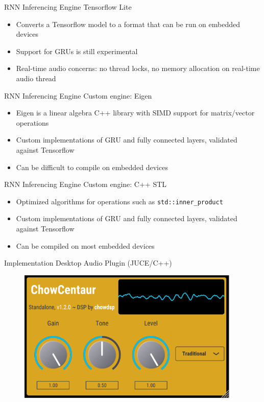 \begin{frame}{RNN Inferencing Engine}
    Tensorflow Lite
    \begin{itemize}
        \item Converts a Tensorflow model to a format that can be run on embedded devices
        \item Support for GRUs is still experimental
        \item Real-time audio concerns: no thread locks, no memory allocation on real-time audio thread
    \end{itemize}
\end{frame}

\begin{frame}{RNN Inferencing Engine}
    Custom engine: Eigen
    \begin{itemize}
        \item Eigen is a linear algebra C++ library with SIMD support for matrix/vector operations
        \item Custom implementations of GRU and fully connected layers, validated against Tensorflow
        \item Can be difficult to compile on embedded devices
    \end{itemize}
\end{frame}

\begin{frame}{RNN Inferencing Engine}
    Custom engine: C++ STL
    \begin{itemize}
        \item Optimized algorithms for operations such as \lstinline{std::inner_product}
        \item Custom implementations of GRU and fully connected layers, validated against Tensorflow
        \item Can be compiled on most embedded devices
    \end{itemize}
\end{frame}

\begin{frame}{Implementation}
    Desktop Audio Plugin (JUCE/C++)
    \begin{figure}
        \centering
        \includegraphics[height=2.5in]{../Paper/Figures/Plugin.png}
    \end{figure}
\end{frame}

